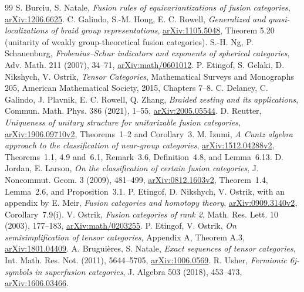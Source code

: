 \documentclass[11pt]{article}
\theoremstyle{remark}\newtheorem{remark}[proposition]{Remark}
\begin{document}
\begin{thebibliography}{99}
 S. Burciu, S. Natale, \emph{Fusion rules of equivariantizations
of fusion categories},
\href{https://arxiv.org/abs/1206.6625}{arXiv:1206.6625}.
 C. Galindo, S.-M. Hong, E. C. Rowell,
\emph{Generalized and quasi-localizations of braid group representations},
\href{https://arxiv.org/abs/1105.5048}{arXiv:1105.5048},
Theorem 5.20 (unitarity of weakly group-theoretical fusion categories).
 S.-H. Ng, P. Schauenburg,
\emph{Frobenius--Schur indicators and exponents of spherical categories},
Adv. Math. 211 (2007), 34--71,
\href{https://arxiv.org/abs/math/0601012}{arXiv:math/0601012}.
 P. Etingof, S. Gelaki, D. Nikshych, V. Ostrik,
\emph{Tensor Categories}, Mathematical Surveys and Monographs 205,
American Mathematical Society, 2015, Chapters 7--8.
 C. Delaney, C. Galindo, J. Plavnik, E. C. Rowell, Q. Zhang,
\emph{Braided zesting and its applications}, Commun. Math. Phys. 386
(2021), 1--55, \href{https://arxiv.org/abs/2005.05544}{arXiv:2005.05544}.
 D. Reutter, \emph{Uniqueness of unitary structure for
unitarizable fusion categories},
\href{https://arxiv.org/abs/1906.09710v2}{arXiv:1906.09710v2},
Theorems~1--2 and Corollary~3.
 M. Izumi, \emph{A Cuntz algebra approach to the
classification of near-group categories},
\href{https://arxiv.org/abs/1512.04288v2}{arXiv:1512.04288v2},
Theorems~1.1, 4.9 and~6.1, Remark~3.6, Definition~4.8, and Lemma~6.13.
 D. Jordan, E. Larson, \emph{On the classification
of certain fusion categories}, J. Noncommut. Geom. 3 (2009), 481--499,
\href{https://arxiv.org/abs/0812.1603v2}{arXiv:0812.1603v2},
Theorem~1.4, Lemma~2.6, and Proposition~3.1.
 P. Etingof, D. Nikshych, V. Ostrik,
with an appendix by E. Meir, \emph{Fusion categories and homotopy theory},
\href{https://arxiv.org/abs/0909.3140v2}{arXiv:0909.3140v2},
Corollary~7.9(i).
 V. Ostrik, \emph{Fusion categories of rank 2},
Math. Res. Lett. 10 (2003), 177--183,
\href{https://arxiv.org/abs/math/0203255}{arXiv:math/0203255}.
 P. Etingof, V. Ostrik,
\emph{On semisimplification of tensor categories}, Appendix A, Theorem A.3,
\href{https://arxiv.org/abs/1801.04409}{arXiv:1801.04409}.
 A. Brugui\`eres, S. Natale,
\emph{Exact sequences of tensor categories}, Int. Math. Res. Not. (2011),
5644--5705, \href{https://arxiv.org/abs/1006.0569}{arXiv:1006.0569}.
 R. Usher, \emph{Fermionic 6j-symbols in superfusion categories},
J. Algebra 503 (2018), 453--473,
\href{https://arxiv.org/abs/1606.03466}{arXiv:1606.03466}.

\end{thebibliography}
\end{document}
